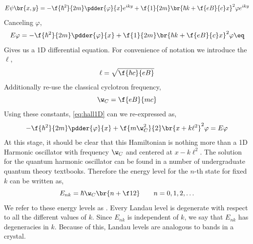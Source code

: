 \documentclass{article}
\begin{document}
\[ E \psi\br{x,y}= - \f{\hbar^2}{2m} \pdder{\varphi}{x} e^{iky} + \f{1}{2m}\br{\hbar k + \f{eB}{c}x}^2 \varphi e^{iky} \]
Canceling $\varphi$,
\[ E \varphi = - \f{\hbar^2}{2m} \pdder{\varphi}{x} + \f{1}{2m}\br{\hbar k + \f{eB}{c}x}^2 \varphi \eq \label{eq:hall1D}\]
Gives us a 1D differential equation. For convenience of notation we introduce the  $\ell$,
\[ \ell = \sqrt{\f{\hbar c}{eB}} \]
Additionally re-use the classical cyclotron frequency,
\[ \w_{C} = \f{eB}{mc} \]
Using these constants, \cref{eq:hall1D} can we re-expressed as,
\[ -\f{\hbar^2}{2m} \pdder{\varphi}{x} + \f{m\w_{C}^2}{2} \br{x + k \ell^{2}}^2 \varphi = E \varphi \]
At this stage, it should be clear that this Hamiltonian is nothing more than a 1D Harmonic oscillator with frequency $\w_{C}$ and centered at $x - k \ell^{2}$. The solution for the quantum harmonic oscillator can be found in a number of undergraduate quantum theory textbooks. Therefore the energy level for the $n$-th state for fixed $k$ can be written as,
\[ E_{nk} = \hbar \w_{C} \br{n + \f12} \qquad n = 0, 1, 2, \ldots \]
We refer to these energy levels as . Every Landau level is degenerate with respect to all the different values of $k$. Since $E_{nk}$ is independent of $k$, we say that $E_{nk}$ has degeneracies in $k$. Because of this, Landau levels are analogous to bands in a crystal.
\end{document}
